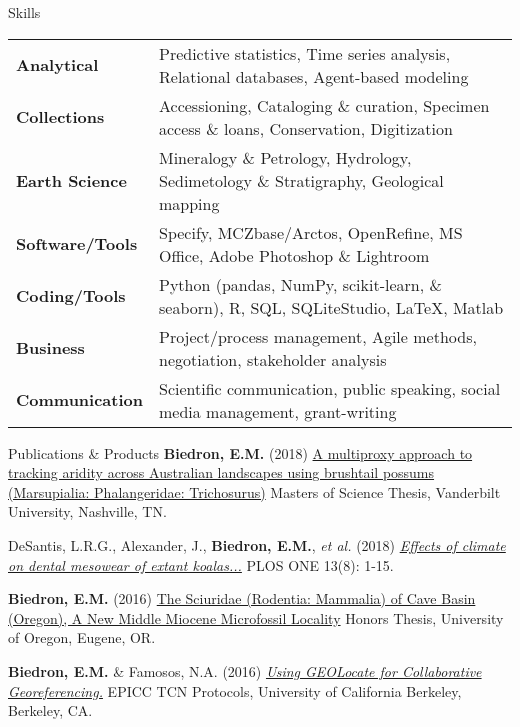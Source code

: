 \documentclass{resume} %
\begin{document}
\begin{rSection}{Skills}	
	\begin{tabular}{ @{} >{\bfseries}l @{\hspace{4ex}} l }	
		Analytical & Predictive statistics, Time series analysis,  Relational databases, Agent-based modeling \\
		Collections & Accessioning, Cataloging \& curation, Specimen access \& loans, Conservation, Digitization \\
		Earth Science & Mineralogy \& Petrology, Hydrology, Sedimetology \& Stratigraphy, Geological mapping\\
		Software/Tools & Specify, MCZbase/Arctos, OpenRefine, MS Office, Adobe Photoshop \& Lightroom \\
		Coding/Tools & Python (pandas, NumPy, scikit-learn, \& seaborn), R, SQL, SQLiteStudio,  \LaTeX, Matlab \\
		Business & Project/process management, Agile methods, negotiation, stakeholder analysis \\
		Communication & Scientific communication, public speaking, social media management, grant-writing \\
		
	\end{tabular}		
\end{rSection}

	\begin{rSection}{Publications \& Products}
		{\bf Biedron, E.M.} (2018) \href{https://etd.library.vanderbilt.edu/etd-07202018-135518}{A multiproxy approach to tracking aridity across Australian landscapes using brushtail possums (Marsupialia: Phalangeridae: Trichosurus)} Masters of Science Thesis, Vanderbilt University, Nashville, TN.
			
		DeSantis, L.R.G., Alexander, J., {\bf Biedron, E.M.}, {\em et al.} (2018) \href{10.1371/journal.pone.0201962}{\em Effects of climate on dental mesowear of extant koalas...} PLOS ONE 13(8): 1-15.
		
		{\bf Biedron, E.M.} (2016) \href{https://scholarsbank.uoregon.edu/xmlui/handle/1794/20264}{The Sciuridae (Rodentia: Mammalia) of Cave Basin (Oregon), A New Middle Miocene Microfossil Locality} Honors Thesis, University of Oregon, Eugene, OR.
		
		{\bf Biedron, E.M.} \& Famosos, N.A. (2016) \href{https://epicc.berkeley.edu/wp-content/uploads/2015/11/UsingGeoLocateforCollaborativeGeoreferencing\_2016.pdf}{\em Using GEOLocate for Collaborative Georeferencing.} EPICC TCN Protocols, University of California Berkeley, Berkeley, CA.
	\end{rSection}
	
\end{document}
